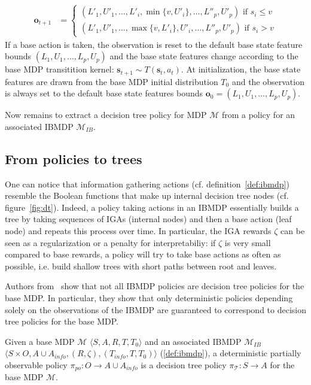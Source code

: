 \begin{definition}
\begin{itemize}
\begin{align*}
    \boldsymbol{o}_{t+1} &= \begin{cases}
        (L'_1, U'_1, \dots , L'_i, \min\{v, U'_i\}, \dots , L''_p, U'_p) \text{ if } s_i \leq v\\
        (L'_1, U'_1, \dots , \max\{v, L'_i\}, U'_i, \dots , L''_p, U'_p) \text{ if } s_i > v
    \end{cases}
\end{align*}
If a base action is taken, the observation is reset to the default base state feature bounds $(L_1, U_1,\dots, L_p, U_p)$ and the base state features change according to the base MDP transitition kernel: $\boldsymbol{s}_{t+1}\sim T(\boldsymbol{s}_t, a_t)$.
At initialization, the base state features are drawn from the base MDP initial distribution $T_0$ and the observation is always set to the default base state features bounds $\boldsymbol{o}_0=(L_1, U_1,\dots, L_p, U_p)$.
\end{itemize}
\end{definition}

Now remains to extract a decision tree policy for MDP $\mathcal{M}$ from a policy for an associated IBMDP $\mathcal{M}_{IB}$. 

\subsection{From policies to trees}

One can notice that information gathering actions (cf. definition~\ref{def:ibmdp}) resemble the Boolean functions that make up internal decision tree nodes (cf. figure~\ref{fig:dt}).
Indeed, a policy taking actions in an IBMDP essentially builds a tree by taking sequences of IGAs (internal nodes) and then a base action (leaf node) and repeats this process over time.
In particular, the IGA rewards $\zeta$ can be seen as a regularization or a penalty for interpretabiliy: if $\zeta$ is very small compared to base rewards, a policy will try to take base actions as often as possible, i.e. build shallow trees with short paths between root and leaves.

Authors from~\cite{topin2021iterative} show that not all IBMDP policies are decision tree policies for the base MDP.
In particular, they show that only deterministic policies depending solely on the observations of the IBMDP are guaranteed to correspond to decision tree policies for the base MDP.

\begin{proposition}\label{def:po-policy}
    Given a base MDP $\mathcal{M}$ $\langle S, A, R, T, T_0\rangle$ and an associated IBMDP $\mathcal{M}_{IB}$ $\langle S \times O,A \cup A_{info}, (R, \zeta), (T_{info}, T, T_0)\rangle$ (\ref{def:ibmdp}), a deterministic partially observable policy $\pi_{po}: O \rightarrow A\cup A_{info}$ is a decision tree policy $\pi_{\mathcal{T}}: S \rightarrow A$ for the base MDP $\mathcal{M}$.
\end{proposition}

